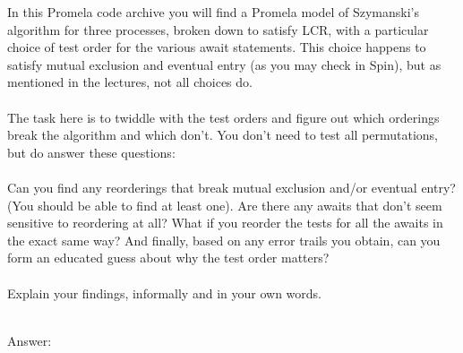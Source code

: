 \documentclass{article}
\begin{document}
\clearpage
\begin{Question} 
In this Promela code archive you will find a Promela model of Szymanski's algorithm for three processes, broken down to satisfy LCR, with a particular choice of test order for the various await statements. This choice happens to satisfy mutual exclusion and eventual entry (as you may check in Spin), but as mentioned in the lectures, not all choices do.\\\\
The task here is to twiddle with the test orders and figure out which orderings break the algorithm and which don't. You don't need to test all permutations, but do answer these questions:\\\\
Can you find any reorderings that break mutual exclusion and/or eventual entry? (You should be able to find at least one). Are there any awaits that don't seem sensitive to reordering at all? What if you reorder the tests for all the awaits in the exact same way? And finally, based on any error trails you obtain, can you form an educated guess about why the test order matters?\\\\
Explain your findings, informally and in your own words.\\\\

\begin{answer}
Answer: \\
\begin{quote}
    
\end{quote}
\end{answer}
\end{Question}
\end{document}
